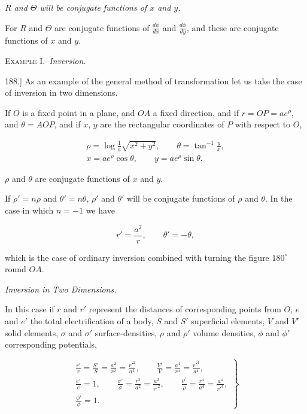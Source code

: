 \documentclass[11pt,a4paper]{article}
\begin{document}
\textit{$R$ and $\Theta$ will be conjugate functions of $x$ and $y$.}

For $R$ and $\Theta$ are conjugate functions of $\frac{d\phi}{dx}$ and $\frac{d\phi}{dy}$, and these are conjugate functions of $x$ and $y$.

\begin{center}
\textsc{Example I.}--\textit{Inversion.}
\end{center}

188.] As an example of the general method of transformation let us take the case of inversion in two dimensions.

If $O$ is a fixed point in a plane, and $OA$ a fixed direction, and if $r=OP=ae^\rho$, and $\theta=AOP$, and if $x$, $y$ are the rectangular coordinates of $P$ with respect to $O$,

\begin{equation}\tag{5}
\begin{gathered}
\rho=\log\frac{1}{a}\sqrt{x^2+y^2},
\qquad
\theta=\tan^{-1}\frac{y}{x},\\
x=ae^\rho\cos\theta,
\qquad
y=ae^\rho\sin\theta,
\end{gathered}
\end{equation}

$\rho$ and $\theta$ are conjugate functions of $x$ and $y$.

If $\rho'=n\rho$ and $\theta'=n\theta$, $\rho'$ and $\theta'$ will be conjugate functions of $\rho$ and $\theta$. In the case in which $n=-1$ we have

\begin{equation}\tag{6}
r'=\frac{a^2}{r},\qquad \theta'=-\theta,
\end{equation}

which is the case of ordinary inversion combined with turning the figure $180^\circ$ round $OA$.

\begin{center}
\textit{Inversion in Two Dimensions.}
\end{center}

In this case if $r$ and $r'$ represent the distances of corresponding points from $O$, $e$ and $e'$ the total electrification of a body, $S$ and $S'$ superficial elements, $V$ and $V'$ solid elements, $\sigma$ and $\sigma'$ surface-densities, $\rho$ and $\rho'$ volume densities, $\phi$ and $\phi'$ corresponding potentials,

\begin{equation}\tag{7}
\left.
\begin{gathered}
\frac{r'}{r}=\frac{S'}{S}=\frac{a^2}{r^2}=\frac{r'^2}{a^2},
\qquad
\frac{V'}{V}=\frac{a^4}{r^4}=\frac{r'^4}{a^4},\\
\frac{e'}{e}=1,\qquad
\frac{\sigma'}{\sigma}=\frac{r^2}{a^2}=\frac{a^2}{r'^2},
\qquad
\frac{\rho'}{\rho}=\frac{r^4}{a^4}=\frac{a^4}{r'^4},\\
\frac{\phi'}{\phi}=1.
\end{gathered}
\right\}
\end{equation}
\end{document}
